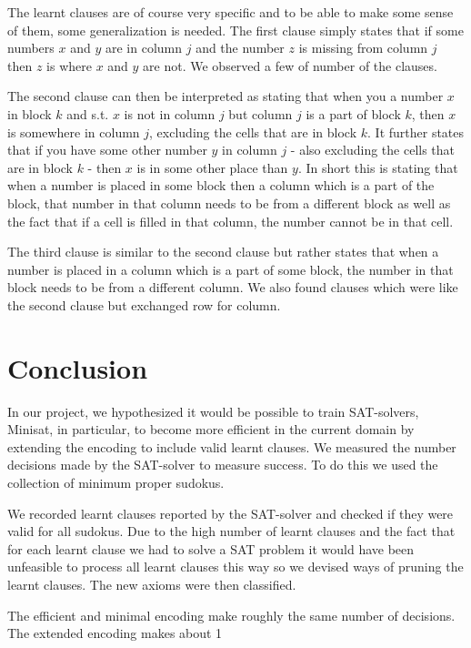 \documentclass{article}
\begin{document}
The learnt clauses are of course very specific and to be able to make some sense of them, some generalization is needed. The first clause simply states that if some numbers $x$ and $y$ are in column $j$ and the number $z$ is missing from column $j$ then $z$ is where $x$ and $y$ are not. We observed a few of number of the clauses.

The second clause can then be interpreted as stating that when you a number $x$ in block $k$ and s.t. $x$ is not in column $j$ but column $j$ is a part of block $k$, then $x$ is somewhere in column $j$, excluding the cells that are in block $k$. It further states that if you have some other number $y$ in column $j$ - also excluding the cells that are in block $k$ - then $x$ is in some other place than $y$. In short this is stating that when a number is placed in some block then a column which is a part of the block, that number in that column needs to be from a different block as well as the fact that if a cell is filled in that column, the number cannot be in that cell.

The third clause is similar to the second clause but rather states that when a number is placed in a column which is a part of some block, the number in that block needs to be from a different column. We also found clauses which were like the second clause but exchanged row for column.

\section{Conclusion} \label{conclusion}
In our project, we hypothesized it would be possible to train SAT-solvers, Minisat, in particular, to become more efficient in the current domain by extending the encoding to include valid learnt clauses. We measured the number decisions made by the SAT-solver to measure success. To do this we used the collection of minimum proper sudokus.

We recorded learnt clauses reported by the SAT-solver and checked if they were valid for all sudokus. Due to the high number of learnt clauses and the fact that for each learnt clause we had to solve a SAT problem it would have been unfeasible to process all learnt clauses this way so we devised ways of pruning the learnt clauses. The new axioms were then classified.

The efficient and minimal encoding make roughly the same number of decisions. The extended encoding makes about 1%
\end{document}
